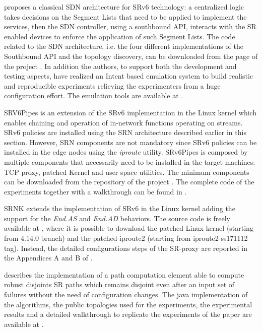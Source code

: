 \cite{ventre2018sdn} proposes a classical SDN architecture for SRv6 technology: a centralized logic takes decisions on the Segment Lists that need to be applied to implement the services, then the SDN controller, using a southbound API, interacts with the SR enabled devices to enforce the application of such Segment Lists. The code related to the SDN architecture, i.e. the four different implementations of the Southbound API and the topology discovery, can be downloaded from the page of the project \cite{srv6-sdn}. In addition the authors, to support both the development and testing aspects, have realized an Intent based emulation system to build realistic and reproducible experiments relieving the experimenters from a huge configuration effort. The emulation tools are available at \cite{rose}.

SRV6Pipes \cite{duchene2018srv6pipes} is an extension of the SRv6 implementation in the Linux kernel \cite{lebrun2017implementing} which enables chaining and operation of in-network functions operating on streams. SRv6 policies are installed using the SRN architecture \cite{lebrun2018software} described earlier in this section. However, SRN components are not mandatory since SRv6 policies can be installed in the edge nodes using the \textit{iproute} utility. SRv6Pipes is composed by multiple components that necessarily need to be installed in the target machines: TCP proxy, patched Kernel and user space utilities. The minimum components can be downloaded from the repository of the project \cite{srv6pipes-code}. The complete code of the experiments together with a walkthrough can be found in \cite{srv6pipes}.

SRNK \cite{mayer2019efficient} extends the implementation of SRv6 in the Linux kernel \cite{lebrun2017implementing} adding the support for the \textit{End.AS} and \textit{End.AD} behaviors. The source code is freely available at \cite{srnk-home}, where it is possible to download the patched Linux kernel (starting from 4.14.0 branch) and the patched iproute2 (starting from iproute2-ss171112 tag). Instead, the detailed configurations steps of the SR-proxy are reported in the Appendices A and B of \cite{mayer2019efficient}.

\cite{aubry2018robustly} describes the implementation of a path computation element able to compute robust disjoints SR paths which remains disjoint even after an input set of failures without the need of configuration changes. The java implementation of the algorithms, the public topologies used for the experiments, the experimental results and a detailed walkthrough to replicate the experiments of the paper are available at \cite{robustly-home}.

